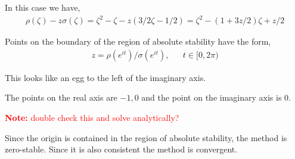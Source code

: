 \documentclass[10pt]{article}
\newcommand{\note}[1]{\textcolor{red}{\textbf{Note:} #1}}
\begin{document}
\begin{solution}[Solution]
In this case we have,
\begin{align*}
    \rho(\zeta) - z\sigma(\zeta) = \zeta^2 - \zeta - z(3/2\zeta - 1/2) = \zeta^2 - (1+3z/2)\zeta + z/2
\end{align*}

Points on the boundary of the region of absolute stability have the form,
\begin{align*}
    z = \rho(e^{i t})/\sigma(e^{it}), && t\in[0,2\pi)
\end{align*}

This looks like an egg to the left of the imaginary axis.

The points on the real axis are \( -1,0 \) and the point on the imaginary axis is \( 0 \).

    \note{double check this and solve analytically?}

Since the origin is contained in the region of absolute stability, the method is zero-stable. Since it is also consistent the method is convergent.

\end{solution}
\end{document}
